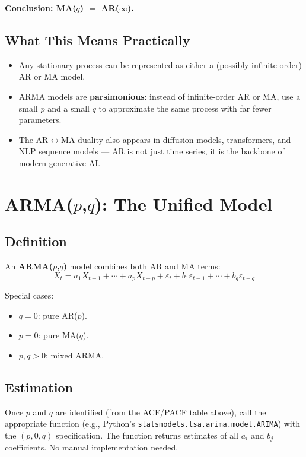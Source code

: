 \documentclass[11pt]{article}
\begin{document}
\textbf{Conclusion: MA($q$) $=$ AR($\infty$).}

\subsection{What This Means Practically}
\begin{itemize}
    \item Any stationary process can be represented as either a (possibly
      infinite-order) AR or MA model.
    \item ARMA models are \textbf{parsimonious}: instead of infinite-order
      AR or MA, use a small $p$ and a small $q$ to approximate the same
      process with far fewer parameters.
    \item The AR$\leftrightarrow$MA duality also appears in diffusion models,
      transformers, and NLP sequence models --- AR is not just time series,
      it is the backbone of modern generative AI.
\end{itemize}


\section{ARMA($p$,$q$): The Unified Model}

\subsection{Definition}
An \textbf{ARMA($p$,$q$)} model combines both AR and MA terms:
\[
X_t = a_1 X_{t-1} + \cdots + a_p X_{t-p}
    + \varepsilon_t + b_1 \varepsilon_{t-1} + \cdots + b_q \varepsilon_{t-q}
\]

Special cases:
\begin{itemize}
    \item $q = 0$: pure AR($p$).
    \item $p = 0$: pure MA($q$).
    \item $p, q > 0$: mixed ARMA.
\end{itemize}

\subsection{Estimation}
Once $p$ and $q$ are identified (from the ACF/PACF table above), call the
appropriate function (e.g., Python's \texttt{statsmodels.tsa.arima.model.ARIMA})
with the $(p, 0, q)$ specification. The function returns estimates of all
$a_i$ and $b_j$ coefficients. No manual implementation needed.
\end{document}
